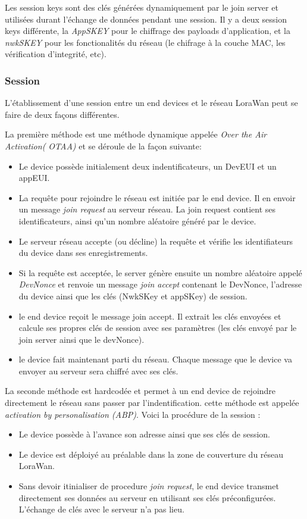 Les session keys sont des clés générées dynamiquement par le join server et utilisées durant l'échange de données pendant une session. Il y a deux session keys différente, la \textit{AppSKEY} pour le chiffrage des payloads d'application, et la \textit{nwkSKEY} pour les fonctionalités du réseau (le chifrage à la couche MAC, les vérification d'integrité, etc).

\subsubsection{Session}

L'établissement d'une session entre un end devices et le réseau LoraWan peut se faire de deux façons différentes.

La première méthode est une méthode dynamique appelée \textit{Over the Air Activation(  OTAA)} et se déroule de la façon suivante: 
\begin{itemize}
\item Le device possède initialement deux indentificateurs, un DevEUI et un appEUI.
\item La requête pour rejoindre le réseau est initiée par le end device. Il en envoir un message \textit{join request} au serveur réseau. La join request contient ses identificateurs, ainsi qu'un nombre aléatoire généré par le device.
\item Le serveur réseau accepte (ou décline) la requête et vérifie les identifiateurs du device dans ses enregistrements. 
\item Si la requête est acceptée, le server génère ensuite un nombre aléatoire appelé \textit{DevNonce} et renvoie un message \textit{join accept} contenant le DevNonce, l'adresse du device ainsi que les clés (NwkSKey et appSKey) de session.
\item le end device reçoit le message join accept. Il extrait les clés envoyées et calcule ses propres clés de session avec ses paramètres (les clés envoyé par le join server ainsi que le devNonce).
\item le device fait maintenant parti du réseau. Chaque message que le device va envoyer au serveur sera chiffré avec ses clés.
\end{itemize}
        
\vspace{0.1cm}
        
La seconde méthode est hardcodée et permet à un end device de rejoindre directement le réseau sans passer par l'indentification. cette méthode est appelée \textit{activation by personalisation (ABP)}. Voici la procédure de la session :
\begin{itemize}
\item Le device possède à l'avance son adresse ainsi que ses clés de session.
\item Le device est déploiyé au préalable dans la zone de couverture du réseau LoraWan.
\item Sans devoir itinialiser de procedure \textit{join request}, le end device transmet directement ses données au serveur en utilisant ses clés préconfigurées. L'échange de clés avec le serveur n'a pas lieu.
\end{itemize}

